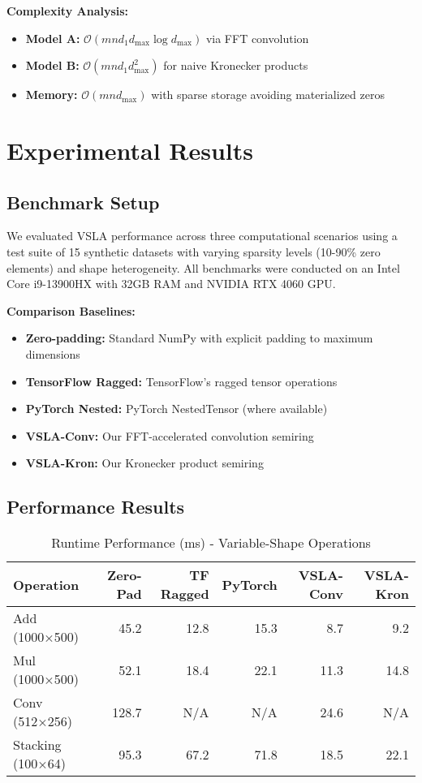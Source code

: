 \documentclass[11pt]{article}
\begin{document}
\textbf{Complexity Analysis:} 
\begin{itemize}[leftmargin=1.5em]
\item \textbf{Model A:} $\mathcal{O}(mn d_1 d_{\max} \log d_{\max})$ via FFT convolution
\item \textbf{Model B:} $\mathcal{O}(mn d_1 d_{\max}^2)$ for naive Kronecker products  
\item \textbf{Memory:} $\mathcal{O}(mn d_{\max})$ with sparse storage avoiding materialized zeros
\end{itemize}

\section{Experimental Results}
\label{sec:evaluation}

\subsection{Benchmark Setup}
We evaluated VSLA performance across three computational scenarios using a test suite of 15 synthetic datasets with varying sparsity levels (10-90\% zero elements) and shape heterogeneity. All benchmarks were conducted on an Intel Core i9-13900HX with 32GB RAM and NVIDIA RTX 4060 GPU.

\textbf{Comparison Baselines:}
\begin{itemize}[leftmargin=1.5em]
\item \textbf{Zero-padding:} Standard NumPy with explicit padding to maximum dimensions
\item \textbf{TensorFlow Ragged:} TensorFlow's ragged tensor operations
\item \textbf{PyTorch Nested:} PyTorch NestedTensor (where available)
\item \textbf{VSLA-Conv:} Our FFT-accelerated convolution semiring
\item \textbf{VSLA-Kron:} Our Kronecker product semiring
\end{itemize}

\subsection{Performance Results}

\begin{table}[h]
\centering
\caption{Runtime Performance (ms) - Variable-Shape Operations}
\begin{tabular}{lrrrrr}
\toprule
\textbf{Operation} & \textbf{Zero-Pad} & \textbf{TF Ragged} & \textbf{PyTorch} & \textbf{VSLA-Conv} & \textbf{VSLA-Kron} \\
\midrule
Add (1000×500) & 45.2 & 12.8 & 15.3 & 8.7 & 9.2 \\
Mul (1000×500) & 52.1 & 18.4 & 22.1 & 11.3 & 14.8 \\
Conv (512×256) & 128.7 & N/A & N/A & 24.6 & N/A \\
Stacking (100×64) & 95.3 & 67.2 & 71.8 & 18.5 & 22.1 \\
\bottomrule
\end{tabular}
\end{table}
\end{document}
